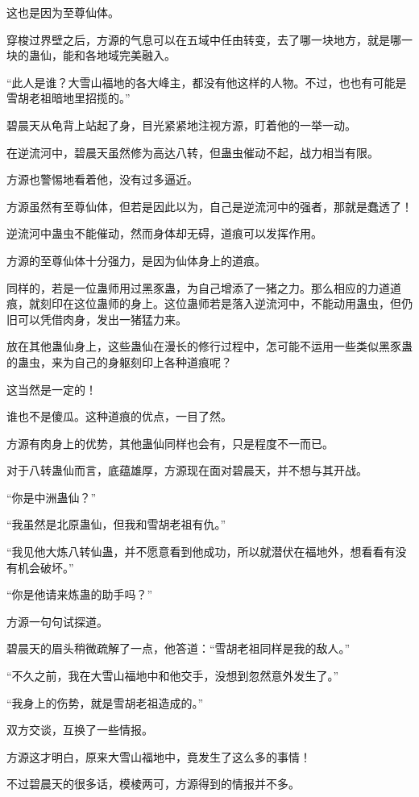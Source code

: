 \begin{this_body}
这也是因为至尊仙体。

穿梭过界壁之后，方源的气息可以在五域中任由转变，去了哪一块地方，就是哪一块的蛊仙，能和各地域完美融入。

“此人是谁？大雪山福地的各大峰主，都没有他这样的人物。不过，也也有可能是雪胡老祖暗地里招揽的。”

碧晨天从龟背上站起了身，目光紧紧地注视方源，盯着他的一举一动。

在逆流河中，碧晨天虽然修为高达八转，但蛊虫催动不起，战力相当有限。

方源也警惕地看着他，没有过多逼近。

方源虽然有至尊仙体，但若是因此以为，自己是逆流河中的强者，那就是蠢透了！

逆流河中蛊虫不能催动，然而身体却无碍，道痕可以发挥作用。

方源的至尊仙体十分强力，是因为仙体身上的道痕。

同样的，若是一位蛊师用过黑豕蛊，为自己增添了一猪之力。那么相应的力道道痕，就刻印在这位蛊师的身上。这位蛊师若是落入逆流河中，不能动用蛊虫，但仍旧可以凭借肉身，发出一猪猛力来。

放在其他蛊仙身上，这些蛊仙在漫长的修行过程中，怎可能不运用一些类似黑豕蛊的蛊虫，来为自己的身躯刻印上各种道痕呢？

这当然是一定的！

谁也不是傻瓜。这种道痕的优点，一目了然。

方源有肉身上的优势，其他蛊仙同样也会有，只是程度不一而已。

对于八转蛊仙而言，底蕴雄厚，方源现在面对碧晨天，并不想与其开战。

“你是中洲蛊仙？”

“我虽然是北原蛊仙，但我和雪胡老祖有仇。”

“我见他大炼八转仙蛊，并不愿意看到他成功，所以就潜伏在福地外，想看看有没有机会破坏。”

“你是他请来炼蛊的助手吗？”

方源一句句试探道。

碧晨天的眉头稍微疏解了一点，他答道：“雪胡老祖同样是我的敌人。”

“不久之前，我在大雪山福地中和他交手，没想到忽然意外发生了。”

“我身上的伤势，就是雪胡老祖造成的。”

双方交谈，互换了一些情报。

方源这才明白，原来大雪山福地中，竟发生了这么多的事情！

不过碧晨天的很多话，模棱两可，方源得到的情报并不多。


\end{this_body}
